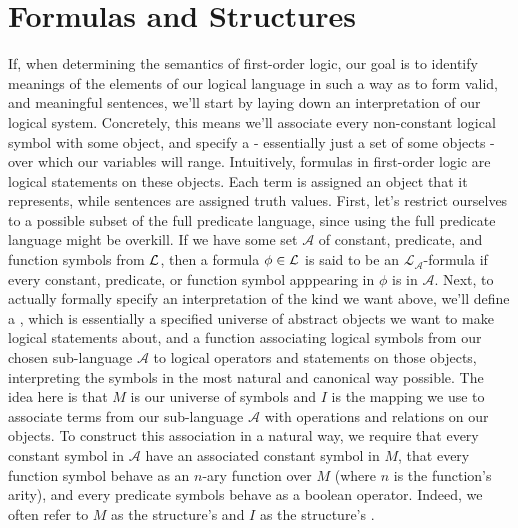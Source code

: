 \documentclass{article}
\begin{document}
\section{Formulas and Structures}
If, when determining the semantics of first-order logic, our goal is to identify meanings of the elements of our logical language in such a way as to form valid, and meaningful sentences, we'll start by laying down an interpretation of our logical system. Concretely, this means we'll associate every non-constant logical symbol with some object, and specify a  - essentially just a set of some objects - over which our variables will range. Intuitively, formulas in first-order logic are logical statements on these objects. Each term is assigned an object that it represents, while sentences are assigned truth values.
\nn
First, let's restrict ourselves to a possible subset of the full predicate language, since using the full predicate language might be overkill. If we have some set $ \mathcal{A} $ of constant, predicate, and function symbols from $ \mathcal{L} $, then a formula $ \phi \in \mathcal{L} $ is said to be an $ \mathcal{L}_\mathcal{A} $-formula if every constant, predicate, or function symbol apppearing in $ \phi $ is in $ \mathcal{A} $. Next, to actually formally specify an interpretation of the kind we want above, we'll define a , which is essentially a specified universe of abstract objects we want to make logical statements about, and a function associating logical symbols from our chosen sub-language $ \mathcal{A} $ to logical operators and statements on those objects, interpreting the symbols in the most natural and canonical way possible.
\n
The idea here is that $ M $ is our universe of symbols and $ I $ is the mapping we use to associate terms from our sub-language $ \mathcal{A} $ with operations and relations on our objects. To construct this association in a natural way, we require that every constant symbol in $ \mathcal{A} $ have an associated constant symbol in $ M $, that every function symbol behave as an $ n $-ary function over $ M $ (where $ n $ is the function's arity), and every predicate symbols behave as a boolean operator. Indeed, we often refer to $ M $ as the structure's  and $ I $ as the structure's .
\end{document}
